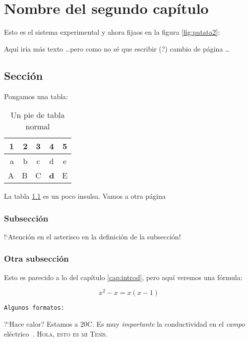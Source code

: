 \chapter{Nombre del segundo capítulo}
\graphicspath{{figuras/cap2/}}
\label{cap:sistexp}

Esto es el sistema experimental y ahora fijaos en la figura \ref{fig:patata2}:


Aquí iría más texto \dots pero como no sé que escribir (?) cambio de página \dots

\newpage

\section{Sección}

Pongamos una tabla:

\begin{table}[!htp]
\centering
 \begin{tabular}{| r | r || c | c | c |}
	\hline
	1 & 2 & 3 & 4 & 5\\\hline
        a & b & c & d & e\\
        A & B & C & {\bf d} & E\\
	\hline
  \end{tabular}
  \caption{Un pie de tabla normal}\label{tab:primera}
\end{table}

La tabla \ref{tab:primera} es un poco insulsa. Vamos a otra página

\newpage

\subsection*{Subsección}

!`Atención en el asterisco en la definición de la subsección!

\subsection*{Otra subsección}

Esto es parecido a lo del capítulo \ref{cap:introd}, pero aquí veremos una fórmula:

\[
 x^{2}-x=x(x-1)
\]

\noindent\verb|Algunos formatos:|

?`Hace calor? Estamos a 20\grc C. Es muy {\sl importante} la conductividad en el {\it campo} eléctrico~\cite{Eltsov2000}. {\scshape Hola, esto es mi Tesis}.
